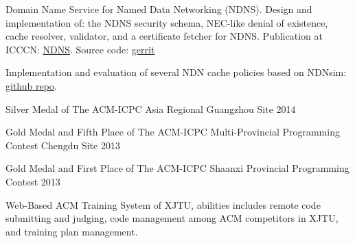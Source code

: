 \documentclass[]{deedy-resume-openfont}
\begin{document}
\begin{tightemize}
\item Domain Name Service for Named Data Networking (NDNS). Design and implementation of: the NDNS security schema, NEC-like denial of existence, cache resolver, validator, and a certificate fetcher for NDNS. Publication at ICCCN: \href{https://named-data.net/publications/2017-icccn-ndns/}{NDNS}. Source code: \href{https://gerrit.named-data.net/#/q/project:ndns}{gerrit}
\item Implementation and evaluation of several NDN cache policies based on NDNsim: \href{https://github.com/ndncomm/nfd-caching-policies}{github repo}.
\end{tightemize}
\sectionsep


\begin{tightemize}
\item Silver Medal of The ACM-ICPC Asia Regional Guangzhou Site 2014
\item Gold Medal and Fifth Place of The ACM-ICPC Multi-Provincial Programming Contest Chengdu Site 2013
\item Gold Medal and First Place of The ACM-ICPC Shaanxi Provincial Programming Contest 2013
\item Web-Based ACM Training System of XJTU, abilities includes remote code submitting and judging, code management among ACM competitors in XJTU, and training plan management.
\end{tightemize}
\sectionsep
\end{document}
